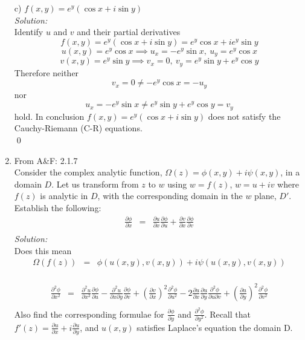 \documentclass[10pt]{amsart}
\theoremstyle{nonumberplain}
\begin{document}
\begin{enumerate}[label={\bf {\arabic*}:}]
\noindent
c) $f(x, y) = e^y(\cos x + i\sin y)$ \\
\textit{Solution:} \\
Identify $u$ and $v$ and their partial derivatives
$$ f(x, y) = e^y(\cos x + i\sin y) = e^y\cos x + ie^y\sin y $$
$$ u(x,y) = e^y\cos x \implies u_x = -e^y \sin x, \: u_y = e^y\cos x $$
$$ v(x,y) = e^y\sin y \implies v_x = 0, \: v_y = e^y\sin y + e^y \cos y $$
Therefore neither
$$v_x = 0 \neq - e^y\cos x = - u_y$$ nor $$u_x = -e^y \sin x \neq e^y\sin y + e^y \cos y = v_y$$ hold.
In conclusion $f(x, y) = e^y(\cos x + i\sin y)$ does not satisfy the Cauchy-Riemann (C-R) equations. \\
\qed
\item From A\&F: 2.1.7 \\
Consider the complex analytic function, $\Omega(z) = \phi(x, y) + i\psi(x, y)$, in a domain $D$.
Let us transform from $z$ to $w$ using $w = f(z)$, $w = u + iv$ where $f(z)$ is analytic in $D$, with the corresponding domain in the $w$ plane, $D'$.
Establish the following: \\
\begin{eqnarray*}
\frac{\partial\phi}{\partial x} &=& \frac{\partial u}{\partial x} \frac{\partial\phi}{\partial u} + \frac{\partial v}{\partial x} \frac{\partial\phi}{\partial v} \\
\end{eqnarray*}
\textit{Solution:}\\
Does this mean 
\begin{eqnarray*}
\Omega(f(z)) &=& \phi(u(x, y), v(x, y)) + i\psi(u(x, y), v(x, y))
\end{eqnarray*}
\\
\begin{eqnarray*}
\frac{\partial^2\phi}{\partial x^2} &=& \frac{\partial^2 u}{\partial x^2} \frac{\partial\phi}{\partial u}
							- \frac{\partial^2 u}{\partial x \partial y} \frac{\partial\phi}{\partial v}
							+ \left(\frac{\partial v}{\partial x}\right)^2 \frac{\partial^2 \phi}{\partial u^2}
							- 2 \frac{\partial u}{\partial x} \frac{\partial u}{\partial y} \frac{\partial^2 \phi}{\partial u \partial v}
							+ \left(\frac{\partial u}{\partial y}\right)^2 \frac{\partial^2 \phi}{\partial v^2} \\
\end{eqnarray*}
Also find the corresponding formulae for $\frac{\partial \phi}{\partial y}$ and $\frac{\partial^2 \phi }{\partial y^2}$.
Recall that $f'(z) = \frac{\partial u }{\partial x} + i\frac{\partial u}{\partial y}$, and $u(x, y)$ satisfies Laplace's equation the domain D.

\end{enumerate}
\end{document}
